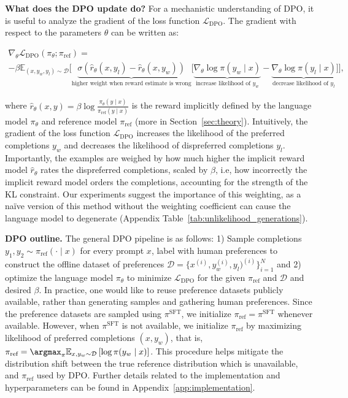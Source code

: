 \textbf{What does the DPO update do?} For a mechanistic understanding of DPO, it is useful to analyze the gradient of the loss function $\mathcal{L}_\text{DPO}$. The gradient with respect to the parameters $\theta$ can be written as:

\begin{multline*}\label{eq:gradient}
    \nabla_\theta \mathcal{L}_\text{DPO}(\pi_\theta;\pi_\text{ref}) = \\ -\beta\mathbb{E}_{(x, y_w, y_l) \sim \mathcal{D}} \bigg[\underbrace{\sigma(\hat{r}_\theta(x, y_l) - \hat{r}_\theta (x, y_w))}_\text{higher weight when reward estimate is wrong}\bigg[\underbrace{\nabla_\theta\log \pi(y_w \mid x)}_\text{increase likelihood of $y_w$} - \underbrace{\nabla_\theta\log\pi(y_l \mid x)}_\text{decrease likelihood of $y_l$}\bigg]\bigg],
\end{multline*}

where $\hat{r}_\theta(x, y) = \beta \log \frac{\pi_\theta(y \mid x)}{\pi_\text{ref}(y \mid x)}$ is the reward implicitly defined by the language model $\pi_\theta$ and reference model $\pi_\text{ref}$ (more in Section~\ref{sec:theory}). Intuitively, the gradient of the loss function $\mathcal{L}_\text{DPO}$ increases the likelihood of the preferred completions $y_w$ and decreases the likelihood of dispreferred completions $y_l$. Importantly, the examples are weighed by how much higher the implicit reward model $\hat{r}_\theta$ rates the dispreferred completions, scaled by $\beta$, i.e, how incorrectly the implicit reward model orders the completions, accounting for the strength of the KL constraint. Our experiments suggest the importance of this weighting, as a na\"ive version of this method without the weighting coefficient can cause the language model to degenerate (Appendix Table~\ref{tab:unlikelihood_generations}).

\textbf{DPO outline.} The general DPO pipeline is as follows: 1) Sample completions $y_1, y_2 \sim \pi_\text{ref}(\cdot \mid x)$ for every prompt $x$, label with human preferences to construct the offline dataset of preferences $\mathcal{D} = \{x^{(i)}, y_w^{(i)}, y_l)^{(i)}\}_{i=1}^N$ and 2) optimize the language model $\pi_\theta$ to minimize $\mathcal{L}_\text{DPO}$ for the given $\pi_\text{ref}$ and $\mathcal{D}$ and desired $\beta$. 
In practice, one would like to reuse preference datasets publicly available, rather than generating samples and gathering human preferences. Since the preference datasets are sampled using $\pi^\text{SFT}$, we initialize $\pi_\text{ref} = \pi^\text{SFT}$ whenever available. However, when $\pi^\text{SFT}$ is not available, we initialize $\pi_\text{ref}$ by maximizing likelihood of preferred completions ${(x, y_w)}$, that is, ${\pi_\text{ref} = \argmax_{\pi}\mathbb{E}_{x, y_w \sim \mathcal{D}}\left[\log \pi(y_w \mid x)\right]}$. This procedure helps mitigate the distribution shift between the true reference distribution which is unavailable, and $\pi_\text{ref}$ used by DPO. Further details related to the implementation and hyperparameters can be found in Appendix~\ref{app:implementation}.

